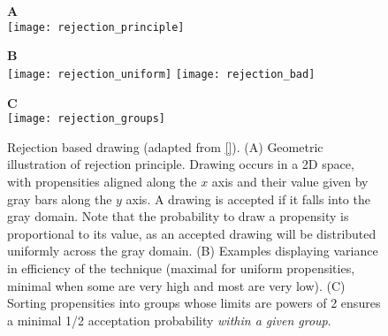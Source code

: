 \begin{figure}[!h]
  \centering
  \begin{minipage}{0.59\textwidth}
    \textbf{A} \\
    \texttt{[image: rejection\_principle]}
  \end{minipage}
  \begin{minipage}{0.39\textwidth}
    \textbf{B} \\
    \texttt{[image: rejection\_uniform]}
    \texttt{[image: rejection\_bad]}
  \end{minipage}
  \begin{minipage}{0.6\textwidth}
    \textbf{C}\\
    \texttt{[image: rejection\_groups]}  
  \end{minipage}
  \caption{Rejection based drawing (adapted from \ref{}). (A) Geometric illustration of rejection principle. Drawing occurs in a 2D space, with propensities aligned along the $x$ axis and their value given by gray bars along the $y$ axis. A drawing is accepted if it falls into the gray domain. Note that the probability to draw a propensity is proportional to its value, as an accepted drawing will be distributed uniformly across the gray domain. (B) Examples displaying variance in efficiency of the technique (maximal for uniform propensities, minimal when some are very high and most are very low). (C) Sorting propensities into groups whose limits are powers of 2 ensures a minimal 1/2 acceptation probability \emph{within a given group}.}
  \label{fig:rejection_based_drawing}
\end {figure}

